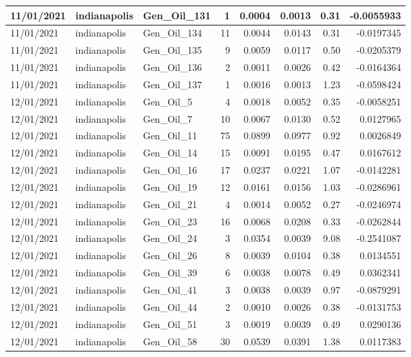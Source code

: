 \documentclass[
  letterpaper,
  DIV=11,
  numbers=noendperiod]{scrartcl}
\begin{document}
\begin{tabular}{l|l|l|r|r|r|r|r}
\hline
11/01/2021 & indianapolis & Gen\_Oil\_131 & 1 & 0.0004 & 0.0013 & 0.31 & -0.0055933\\
\hline
11/01/2021 & indianapolis & Gen\_Oil\_134 & 11 & 0.0044 & 0.0143 & 0.31 & -0.0197345\\
\hline
11/01/2021 & indianapolis & Gen\_Oil\_135 & 9 & 0.0059 & 0.0117 & 0.50 & -0.0205379\\
\hline
11/01/2021 & indianapolis & Gen\_Oil\_136 & 2 & 0.0011 & 0.0026 & 0.42 & -0.0164364\\
\hline
11/01/2021 & indianapolis & Gen\_Oil\_137 & 1 & 0.0016 & 0.0013 & 1.23 & -0.0598424\\
\hline
12/01/2021 & indianapolis & Gen\_Oil\_5 & 4 & 0.0018 & 0.0052 & 0.35 & -0.0058251\\
\hline
12/01/2021 & indianapolis & Gen\_Oil\_7 & 10 & 0.0067 & 0.0130 & 0.52 & 0.0127965\\
\hline
12/01/2021 & indianapolis & Gen\_Oil\_11 & 75 & 0.0899 & 0.0977 & 0.92 & 0.0026849\\
\hline
12/01/2021 & indianapolis & Gen\_Oil\_14 & 15 & 0.0091 & 0.0195 & 0.47 & 0.0167612\\
\hline
12/01/2021 & indianapolis & Gen\_Oil\_16 & 17 & 0.0237 & 0.0221 & 1.07 & -0.0142281\\
\hline
12/01/2021 & indianapolis & Gen\_Oil\_19 & 12 & 0.0161 & 0.0156 & 1.03 & -0.0286961\\
\hline
12/01/2021 & indianapolis & Gen\_Oil\_21 & 4 & 0.0014 & 0.0052 & 0.27 & -0.0246974\\
\hline
12/01/2021 & indianapolis & Gen\_Oil\_23 & 16 & 0.0068 & 0.0208 & 0.33 & -0.0262844\\
\hline
12/01/2021 & indianapolis & Gen\_Oil\_24 & 3 & 0.0354 & 0.0039 & 9.08 & -0.2541087\\
\hline
12/01/2021 & indianapolis & Gen\_Oil\_26 & 8 & 0.0039 & 0.0104 & 0.38 & 0.0134551\\
\hline
12/01/2021 & indianapolis & Gen\_Oil\_39 & 6 & 0.0038 & 0.0078 & 0.49 & 0.0362341\\
\hline
12/01/2021 & indianapolis & Gen\_Oil\_41 & 3 & 0.0038 & 0.0039 & 0.97 & -0.0879291\\
\hline
12/01/2021 & indianapolis & Gen\_Oil\_44 & 2 & 0.0010 & 0.0026 & 0.38 & -0.0131753\\
\hline
12/01/2021 & indianapolis & Gen\_Oil\_51 & 3 & 0.0019 & 0.0039 & 0.49 & 0.0290136\\
\hline
12/01/2021 & indianapolis & Gen\_Oil\_58 & 30 & 0.0539 & 0.0391 & 1.38 & 0.0117383\\

\end{tabular}
\end{document}
